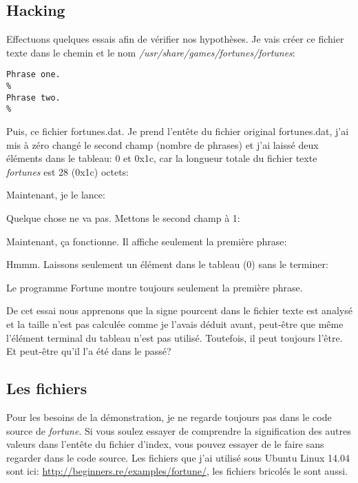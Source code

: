 \subsection{Hacking}

Effectuons quelques essais afin de vérifier nos hypothèses.
Je vais créer ce fichier texte dans le chemin et le nom \emph{/usr/share/games/fortunes/fortunes}:

\begin{lstlisting}
Phrase one.
%
Phrase two.
%
\end{lstlisting}

Puis, ce fichier fortunes.dat. Je prend l'entête du fichier original fortunes.dat,
j'ai mis à zéro changé le second champ (nombre de phrases) et j'ai laissé deux éléments
dans le tableau: 0 et 0x1c, car la longueur totale du fichier texte \emph{fortunes}
est 28 (0x1c) octets:



Maintenant, je le lance:



Quelque chose ne va pas. Mettons le second champ à 1:



Maintenant, ça fonctionne. Il affiche seulement la première phrase:



Hmmm. Laissons seulement un élément dans le tableau (0) sans le terminer:



Le programme Fortune montre toujours seulement la première phrase.

De cet essai nous apprenons que la signe pourcent dans le fichier texte est analysé
et la taille n'est pas calculée comme je l'avais déduit avant, peut-être que même
l'élément terminal du tableau n'est pas utilisé.
Toutefois, il peut toujours l'être. Et peut-être qu'il l'a été dans le passé?


\subsection{Les fichiers}

Pour les besoins de la démonstration, je ne regarde toujours pas dans le code source
de \emph{fortune}.
Si vous soulez essayer de comprendre la signification des autres valeurs dans l'entête
du fichier d'index, vous pouvez essayer de le faire sans regarder dans le code source.
Les fichiers que j'ai utilisé sous Ubuntu Linux 14.04 sont ici: \url{http://beginners.re/examples/fortune/},
les fichiers bricolés le sont aussi.

